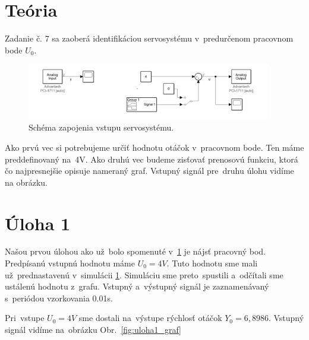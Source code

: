 \documentclass{article}
\begin{document}
\clearpage

\section{Teória}
\label{sec:teoria}

Zadanie č. 7 sa zaoberá identifikáciou servosystému v~predurčenom pracovnom bode $U_0$.

\begin{figure}[!htbp]
	\begin{center}
		\includegraphics[width=0.95\textwidth]{include/schema.png}
	\end{center}
	\caption{Schéma zapojenia vstupu servosystému.}
	\label{fig:schema}
\end{figure}

Ako prvú vec si potrebujeme určiť hodnotu otáčok v~pracovnom bode. Ten máme preddefinovaný na~4V. Ako druhú vec budeme
zisťovať prenosovú funkciu, ktorá čo najpresnejšie opisuje nameraný graf. Vstupný signál pre~druhu úlohu vidíme na
obrázku.

\clearpage

\section{Úloha 1}
\label{sec:u1}

Našou prvou úlohou ako už~bolo spomenuté v~\ref{sec:teoria} je nájsť pracovný bod. Predpísanú vstupnú hodnotu máme
$U_0 = 4V$. Tuto hodnotu sme mali už~prednastavenú v~simulácii \ref{fig:schema}. Simuláciu sme preto~spustili
a~odčítali sme ustálenú hodnotu z~grafu. Vstupný a~výstupný signál je zaznamenávaný s~periódou vzorkovania 0.01s.

Pri~vstupe $U_0 = 4V$ sme dostali na~výstupe rýchlosť otáčok $Y_0 = 6,8986$. Vstupný signál vidíme na~obrázku
Obr.~\ref{fig:uloha1_graf}
\end{document}
